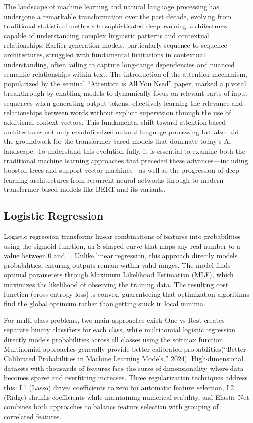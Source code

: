 \documentclass[
  titlepage]{article}
\begin{document}
The landscape of machine learning and natural language processing has
undergone a remarkable transformation over the past decade, evolving
from traditional statistical methods to sophisticated deep learning
architectures capable of understanding complex linguistic patterns and
contextual relationships. Earlier generation models, particularly
sequence-to-sequence architectures, struggled with fundamental
limitations in contextual understanding, often failing to capture
long-range dependencies and nuanced semantic relationships within text.
The introduction of the attention mechanism, popularized by the seminal
``Attention is All You Need'' paper, marked a pivotal breakthrough by
enabling models to dynamically focus on relevant parts of input
sequences when generating output tokens, effectively learning the
relevance and relationships between words without explicit supervision
through the use of additional context vectors. This fundamental shift
toward attention-based architectures not only revolutionized natural
language processing but also laid the groundwork for the
transformer-based models that dominate today's AI landscape. To
understand this evolution fully, it is essential to examine both the
traditional machine learning approaches that preceded these
advances---including boosted trees and support vector machines---as well
as the progression of deep learning architectures from recurrent neural
networks through to modern transformer-based models like BERT and its
variants.

\subsection{Logistic Regression}\label{logistic-regression}

Logistic regression transforms linear combinations of features into
probabilities using the sigmoid function, an S-shaped curve that maps
any real number to a value between 0 and 1. Unlike linear regression,
this approach directly models probabilities, ensuring outputs remain
within valid ranges. The model finds optimal parameters through Maximum
Likelihood Estimation (MLE), which maximizes the likelihood of observing
the training data. The resulting cost function (cross-entropy loss) is
convex, guaranteeing that optimization algorithms find the global
optimum rather than getting stuck in local minima.

For multi-class problems, two main approaches exist: One-vs-Rest creates
separate binary classifiers for each class, while multinomial logistic
regression directly models probabilities across all classes using the
softmax function. Multinomial approaches generally provide better
calibrated probabilities({``Better Calibrated Probabilities in Machine
Learning Models,''} 2024). High-dimensional datasets with thousands of
features face the curse of dimensionality, where data becomes sparse and
overfitting increases. Three regularization techniques address this: L1
(Lasso) drives coefficients to zero for automatic feature selection, L2
(Ridge) shrinks coefficients while maintaining numerical stability, and
Elastic Net combines both approaches to balance feature selection with
grouping of correlated features.
\end{document}
